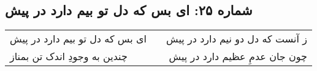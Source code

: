 \begin{center}
\section*{شماره ۲۵: ای بس که دل تو بیم دارد در پیش}
\label{sec:025}
\begin{longtable}{l p{0.5cm} r}
ای بس که دل تو بیم دارد در پیش
&&
ز آنست که دل دو نیم دارد در پیش
\\
چندین به وجودِ اندک تن بمناز
&&
چون جان عدمِ عظیم دارد در پیش
\\
\end{longtable}
\end{center}
